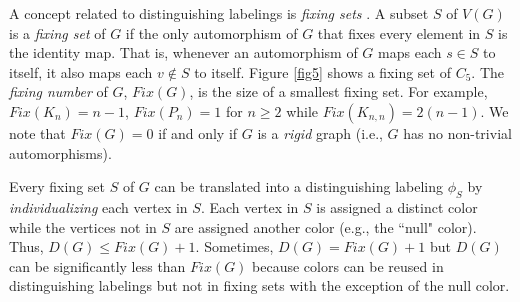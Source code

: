 \documentclass[11pt]{article}
\begin{document}
  
 A concept related to distinguishing labelings is {\it fixing sets} \cite{DBLP:journals/dm/ErwinH06, DBLP:journals/combinatorics/Boutin06, DBLP:journals/gc/FijavzM10}.  A subset $S$ of $V(G)$ is a {\it fixing set} of $G$  if the only automorphism of $G$ that fixes every element in $S$ is the identity map.  That is, whenever an automorphism of $G$ maps each $s \in S$ to itself, it also maps each $v \not \in S$ to itself.  Figure \ref{fig5} shows a fixing set of $C_5$.   The {\it fixing number} of $G$, $Fix(G)$, is the size of a smallest fixing set.   For example,  $Fix(K_n) = n-1$, $Fix(P_n) = 1$ for $n \ge 2$ while $Fix(K_{n,n} )= 2(n-1)$.     We note that $Fix(G) = 0$ if and only if $G$ is a {\it rigid} graph (i.e., $G$ has no non-trivial automorphisms).
 
Every fixing set $S$ of $G$ can be translated into a distinguishing labeling $\phi_S$ by {\it individualizing} each vertex in $S$.  Each vertex in $S$ is assigned a distinct color while the vertices not in $S$ are assigned another color (e.g., the ``null" color).   Thus, $D(G) \leq Fix(G) +1$.  Sometimes, $D(G) = Fix(G) + 1$ but $D(G)$ can be significantly less than $Fix(G)$  because  colors can be reused in distinguishing labelings but not in fixing sets with the exception of the null color. 
 
 
 
 
\end{document}
